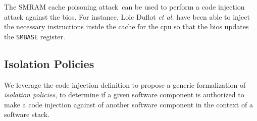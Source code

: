 \begin{example}
  The SMRAM cache poisoning attack\,\cite{duflot2009smram,wojtczuk2009smram} can
  be used to perform a code injection attack against the \ac{bios}. For
  instance, Loic Duflot \emph{et al.} have been able to inject the necessary
  instructions inside the cache for the \ac{cpu} so that the \ac{bios} updates
  the \texttt{SMBASE} register. 
\end{example}

\subsection{Isolation Policies}
\label{subsec:speccert2:globalsec}

We leverage the code injection definition to propose a generic formalization of
\emph{isolation policies}, to determine if a given software component is
authorized to make a code injection against of another software component in the
context of a software stack.

